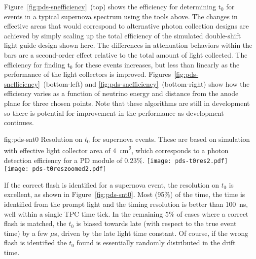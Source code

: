 Figure~\ref{fig:pds-snefficiency}~(top) shows the efficiency for determining t$_0$ for events in a typical supernova spectrum using the tools above. The changes in effective areas that would correspond to alternative photon collection designs are achieved by simply scaling up the total efficiency of the simulated double-shift light guide design shown here. The differences in attenuation behaviors within the bars are a second-order effect relative to the total amount of light collected. The efficiency for finding t$_0$ for these events increases, but less than linearly as the performance of the light collectors is improved. Figures~\ref{fig:pds-snefficiency}~(bottom-left) and \ref{fig:pds-snefficiency}~(bottom-right) show how the efficiency varies as a function of neutrino energy and distance from the anode plane for three chosen points. Note that these algorithms are still in development so there is potential for improvement in the performance as development continues.

\begin{dunefigure}{fig:pds-snt0}
{Resolution on $t_0$ for supernova events. These are based on simulation with effective light collector area of \SI{4}{cm^2}, which corresponds to a photon detection efficiency for a PD module of 0.23\%.}
  \texttt{[image: pds-t0res2.pdf]}\\
  \texttt{[image: pds-t0reszoomed2.pdf]}
\end{dunefigure}

If the correct flash is identified for a supernova event, the resolution on $t_0$ is excellent, as shown in Figure~\ref{fig:pds-snt0}. Most (95\%) of the time, the time is identified from the prompt light and the timing resolution is better than \SI{100}{ns}, well within a single TPC time tick. In the remaining 5\% of cases where a correct flash is matched, the $t_0$ is biased towards late (with respect to the true event time) by a few $\mu$s, driven by the late light time constant. Of course, if the wrong flash is identified the $t_0$ found is essentially randomly distributed in the drift time.

